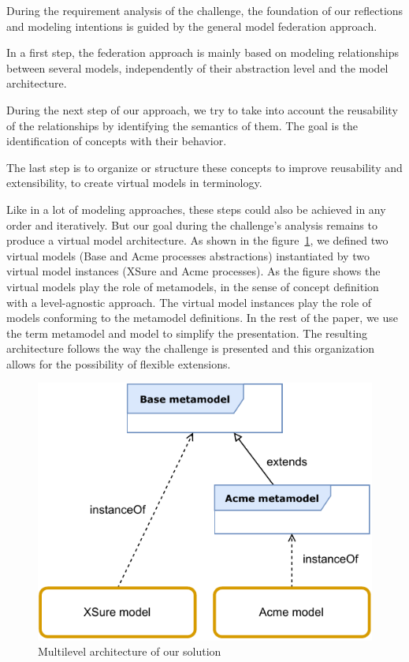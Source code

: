 
During the requirement analysis of the challenge, the foundation of our reflections and modeling intentions is guided by the general model federation approach.

In a first step, the federation approach is mainly based on modeling relationships between several models, independently of their abstraction level and the model architecture.

During the next step of our approach, we try to take into account the reusability of the relationships by identifying the semantics of them. The goal is the identification of concepts with their behavior. 

The last step is to organize or structure these concepts to improve reusability and extensibility, to create virtual models in \FML terminology.

Like in a lot of modeling approaches, these  steps could also be achieved in any order and iteratively. But our goal during the challenge's analysis remains to produce a \FML virtual model architecture. 
As shown in the figure~\ref{fig:MultilevelArchitecture}, we defined two virtual models (Base and Acme processes abstractions) instantiated by two virtual model instances (XSure and Acme processes). As the figure shows the virtual models play the role of metamodels, in the sense of concept definition with a level-agnostic approach. The virtual model instances play the role of models conforming to the metamodel definitions. In the rest of the paper, we use the term metamodel and model to simplify the presentation.
The resulting architecture follows the way the challenge is presented and this
organization allows for the possibility of flexible extensions.


\begin{figure}[t]
    \centering
    \includegraphics[width=0.9 \columnwidth]{Figures/MultilevelArchitecture.pdf}
    \caption{Multilevel architecture of our solution}
    \label{fig:MultilevelArchitecture}
\end{figure}

